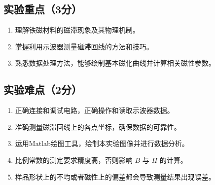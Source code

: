 \documentclass[]{../../templates/Report}%
\begin{document}
\subsection{实验重点（3分）}
\begin{enumerate}
    \item 理解铁磁材料的磁滞现象及其物理机制。
    \item 掌握利用示波器测量磁滞回线的方法和技巧。
    \item 熟悉数据处理方法，能够绘制基本磁化曲线并计算相关磁性参数。
\end{enumerate}
\subsection{实验难点（2分）}
\begin{enumerate}
    \item 正确连接和调试电路，正确操作和读取示波器数据。
    \item 准确测量磁滞回线上的各点坐标，确保数据的可靠性。
    \item 运用Matlab绘图工具，绘制本实验图像并进行数据分析。
    \item 比例常数的测定要求精度高，否则影响 $B$ 与 $H$ 的计算。
    \item 样品形状上的不均或者磁性上的偏差都会导致测量结果出现误差。

\end{enumerate}
\end{document}
